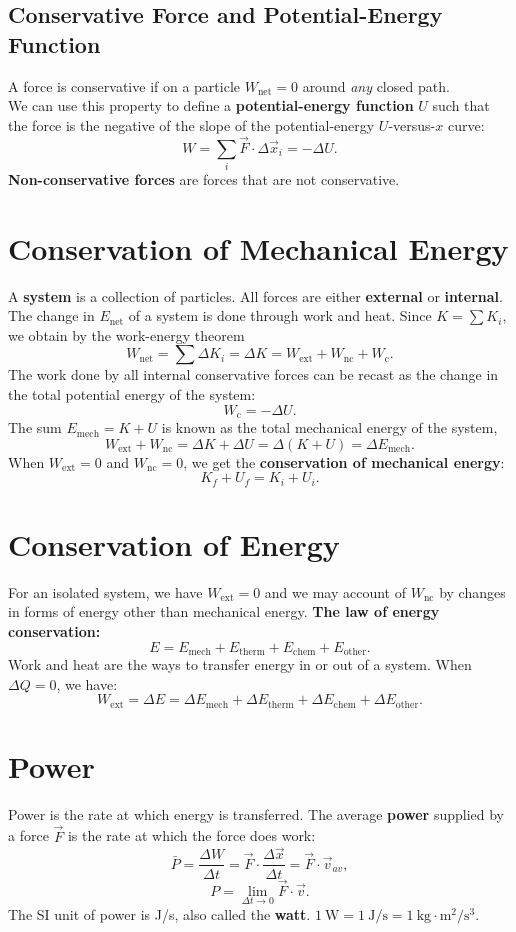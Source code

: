 \documentclass[11pt,letter]{report}
\begin{document}
\subsection{Conservative Force and Potential-Energy Function}

A force is conservative if on a particle $W_\mathrm{net} = 0$ around \textit{any} closed path.
\\We can use this property to define a \textbf{potential-energy function} $U$ such that the force is the negative of the slope of the potential-energy $U$-versus-$x$ curve: $$W = \sum_i \vec{F} \cdot \Delta{\vec{x}_i} = -\Delta{U}.$$
\textbf{Non-conservative forces} are forces that are not conservative.

\section{Conservation of Mechanical Energy}
A \textbf{system} is a collection of particles. All forces are either \textbf{external} or \textbf{internal}. The change in $E_\mathrm{net}$ of a system is done through work and heat. Since $K = \sum{K_i}$, we obtain by the work-energy theorem $$W_\mathrm{net} = \sum{\Delta{K_i}} = \Delta{K} = W_\mathrm{ext} + W_\mathrm{nc} + W_\mathrm{c}.$$
The work done by all internal conservative forces can be recast as the change in the total potential energy of the system: $$W_\mathrm{c} = -\Delta{U}.$$
The sum $E_\mathrm{mech} = K + U$ is known as the total mechanical energy of the system, $$W_\mathrm{ext} + W_\mathrm{nc} = \Delta{K} + \Delta{U} = \Delta{\left(K + U\right)} = \Delta{E_\mathrm{mech}}.$$
When $W_\mathrm{ext} = 0$ and $W_\mathrm{nc} = 0$, we get the \textbf{conservation of mechanical energy}: $$K_f + U_f = K_i + U_i.$$

\section{Conservation of Energy}
For an isolated system, we have $W_\mathrm{ext} = 0$ and we may account of $W_\mathrm{nc}$ by changes in forms of energy other than mechanical energy. \textbf{The law of energy conservation:} $$E = E_\mathrm{mech} + E_\mathrm{therm} + E_\mathrm{chem} + E_\mathrm{other}.$$
Work and heat are the ways to transfer energy in or out of a system. When $\Delta{Q} = 0$, we have: $$W_\mathrm{ext} = \Delta{E} = \Delta{E_\mathrm{mech}} + \Delta{E_\mathrm{therm}} + \Delta{E_\mathrm{chem}} + \Delta{E_\mathrm{other}}.$$

\section{Power}
Power is the rate at which energy is transferred. The average \textbf{power} supplied by a force $\vec{F}$ is the rate at which the force does work: $$\bar{P} = \frac{\Delta{W}}{\Delta{t}} = \vec{F} \cdot \frac{\Delta{\vec{x}}}{\Delta{t}} = \vec{F} \cdot \vec{v}_{av},$$ $$P = \lim_{\Delta{t} \to 0} \vec{F} \cdot \vec{v}.$$
The SI unit of power is J/s, also called the \textbf{watt}. $1 \mathrm{\ W} = 1 \mathrm{\ J} / \mathrm{s} = 1 \mathrm{\ kg} \cdot \mathrm{m}^2 / \mathrm{s}^3$.
\end{document}

